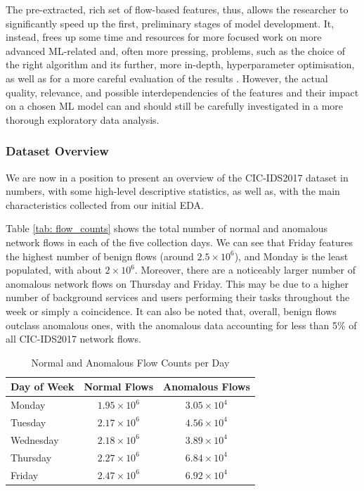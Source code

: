 The pre-extracted, rich set of flow-based features, thus, allows the researcher to significantly speed up the first, preliminary stages of model development. It, instead, frees up some time and resources for more focused work on more advanced ML-related and, often more pressing, problems, such as the choice of the right algorithm and its further, more in-depth, hyperparameter optimisation, as well as for a more careful evaluation of the results \parencite {shafi2022comprehensive}. However, the actual quality, relevance, and possible interdependencies of the features and their impact on a chosen ML model can and should still be carefully investigated in a more thorough exploratory data analysis.

\subsubsection{Dataset Overview} 
We are now in a position to present an overview of the CIC-IDS2017 dataset in numbers, with some high-level descriptive statistics, as well as, with the main characteristics collected from our initial EDA.

Table \ref{tab: flow_counts} shows the total number of normal and anomalous network flows in each of the five collection days. We can see that Friday features the highest number of benign flows (around $2.5\times10^6$), and Monday is the least populated, with about $2\times10^6$. Moreover, there are a noticeably larger number of anomalous network flows on Thursday and Friday. This may be due to a higher number of background services and users performing their tasks throughout the week or simply a coincidence. It can also be noted that, overall, benign flows outclass anomalous ones, with the anomalous data accounting for less than 5\% of all CIC-IDS2017 network flows.

\begin{table}[h] 
\centering 
\caption{Normal and Anomalous Flow Counts per Day} 
\label{tab:flow_counts} 
\begin{tabular}{lcc} 
\toprule 
Day of Week & Normal Flows & Anomalous Flows \\ 
\midrule 
Monday & $1.95\times10^6$ & $3.05\times10^4$ \\ 
Tuesday & $2.17\times10^6$ & $4.56\times10^4$ \\ 
Wednesday & $2.18\times10^6$ & $3.89\times10^4$ \\ 
Thursday & $2.27\times10^6$ & $6.84\times10^4$ \\ 
Friday & $2.47\times10^6$ & $6.92\times10^4$ \\ 
\bottomrule 
\end{tabular} 
\end{table} 

